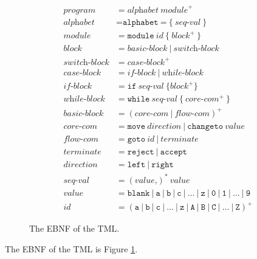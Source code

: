 \begin{appendices}
\begin{figure}[htb]
    \centering
    \begin{align*}
        \textit{program} &= \textit{alphabet} \ \textit{module}^+ \\
        \textit{alphabet} &= \texttt{alphabet} \ \texttt{=} \ \texttt{\{} \ \textit{seq-val} \ \texttt{\}} \\
        \textit{module} &= \texttt{module} \ \textit{id} \ \texttt{\{} \ \textit{block}^+ \ \texttt{\}} \\
        \textit{block} &= \textit{basic-block} \ | \ \textit{switch-block} \\
        \textit{switch-block} &= \textit{case-block}^+ \\
        \textit{case-block} &= \textit{if-block} \ | \ \textit{while-block} \\
        \textit{if-block} &= \texttt{if} \ \textit{seq-val} \ \texttt{\{} \textit{block}^+ \texttt{\}} \\
        \textit{while-block} &= \texttt{while} \ \textit{seq-val} \ \texttt{\{} \ \textit{core-com}^+ \ \texttt{\}} \\
        \textit{basic-block} &= (\textit{core-com} \ | \ \textit{flow-com})^+ \\
        \textit{core-com} &= \texttt{move} \ \textit{direction} \ | \ \texttt{changeto} \ \textit{value} \\
        \textit{flow-com} &= \texttt{goto} \ \textit{id} \ | \ \textit{terminate} \\
        \textit{terminate} &= \texttt{reject} \ | \ \texttt{accept} \\
        \textit{direction} &= \texttt{left} \ | \ \texttt{right} \\
        \textit{seq-val} &= (\textit{value} \texttt{,})^* \ \textit{value} \\
        \textit{value} &= \texttt{blank} \ | \ \texttt{a} \ | \ \texttt{b} \ | \ \texttt{c} \ | \ \dots \ | \ \texttt{z} \ | \ \texttt{0} \ | \ \texttt{1} \ | \ \dots \ | \ \texttt{9} \\
        \textit{id} &= (\texttt{a} \ | \ \texttt{b} \ | \ \texttt{c} \ | \ \dots \ | \ \texttt{z} \ | \ \texttt{A} \ | \ \texttt{B} \ | \ \texttt{C} \ | \ \dots \ | \ \texttt{Z})^+
    \end{align*}
    \caption{The EBNF of the TML.}
    \label{fig:tml_ebnf}
\end{figure}

The EBNF of the TML is Figure \ref{fig:tml_ebnf}.


\end{appendices}
